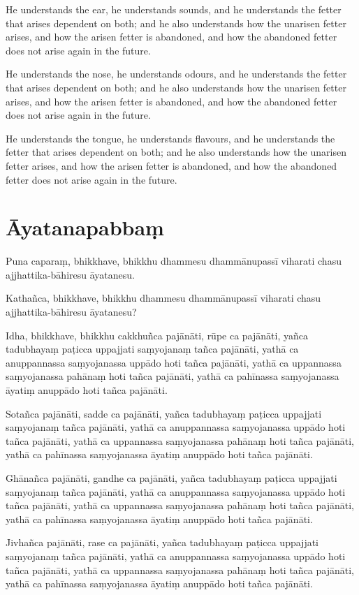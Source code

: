 He understands the ear, he understands sounds, and he understands the fetter
that arises dependent on both; and he also understands how the unarisen fetter
arises, and how the arisen fetter is abandoned, and how the abandoned fetter
does not arise again in the future.

He understands the nose, he understands odours, and he understands the fetter
that arises dependent on both; and he also understands how the unarisen fetter
arises, and how the arisen fetter is abandoned, and how the abandoned fetter
does not arise again in the future.

He understands the tongue, he understands flavours, and he understands the
fetter that arises dependent on both; and he also understands how the unarisen
fetter arises, and how the arisen fetter is abandoned, and how the abandoned
fetter does not arise again in the future.

\paliPage
\section*{Āyatanapabbaṃ}

Puna caparaṃ, bhikkhave, bhikkhu dhammesu dhammānupassī viharati chasu
ajjhattika-bāhiresu āyatanesu.

Kathañca, bhikkhave, bhikkhu dhammesu dhammānupassī viharati chasu
ajjhattika-bāhiresu āyatanesu?

Idha, bhikkhave, bhikkhu
cakkhuñca pajānāti,
rūpe ca pajānāti,
yañca tadubhayaṃ paṭicca uppajjati saṃyojanaṃ tañca pajānāti,
yathā ca anuppannassa saṃyojanassa uppādo hoti tañca pajānāti,
yathā ca uppannassa saṃyojanassa pahānaṃ hoti tañca pajānāti,
yathā ca pahīnassa saṃyojanassa āyatiṃ anuppādo hoti tañca pajānāti.

Sotañca pajānāti,
sadde ca pajānāti,
yañca tadubhayaṃ paṭicca uppajjati saṃyojanaṃ tañca pajānāti,
yathā ca anuppannassa saṃyojanassa uppādo hoti tañca pajānāti,
yathā ca uppannassa saṃyojanassa pahānaṃ hoti tañca pajānāti,
yathā ca pahīnassa saṃyojanassa āyatiṃ anuppādo hoti tañca pajānāti.

Ghānañca pajānāti,
gandhe ca pajānāti,
yañca tadubhayaṃ paṭicca uppajjati saṃyojanaṃ tañca pajānāti,
yathā ca anuppannassa saṃyojanassa uppādo hoti tañca pajānāti,
yathā ca uppannassa saṃyojanassa pahānaṃ hoti tañca pajānāti,
yathā ca pahīnassa saṃyojanassa āyatiṃ anuppādo hoti tañca pajānāti.

Jivhañca pajānāti,
rase ca pajānāti,
yañca tadubhayaṃ paṭicca uppajjati saṃyojanaṃ tañca pajānāti,
yathā ca anuppannassa saṃyojanassa uppādo hoti tañca pajānāti,
yathā ca uppannassa saṃyojanassa pahānaṃ hoti tañca pajānāti,
yathā ca pahīnassa saṃyojanassa āyatiṃ anuppādo hoti tañca pajānāti.

